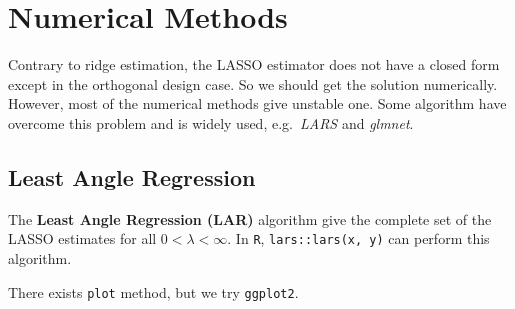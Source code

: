 \documentclass[]{book}
\newenvironment{Shaded}{\begin{snugshade}}{\end{snugshade}}
\newcommand{\CommentTok}[1]{\textcolor[rgb]{0.56,0.35,0.01}{\textit{#1}}}
\newcommand{\DataTypeTok}[1]{\textcolor[rgb]{0.13,0.29,0.53}{#1}}
\newcommand{\DecValTok}[1]{\textcolor[rgb]{0.00,0.00,0.81}{#1}}
\newcommand{\KeywordTok}[1]{\textcolor[rgb]{0.13,0.29,0.53}{\textbf{#1}}}
\newcommand{\NormalTok}[1]{#1}
\newcommand{\OperatorTok}[1]{\textcolor[rgb]{0.81,0.36,0.00}{\textbf{#1}}}
\newcommand{\OtherTok}[1]{\textcolor[rgb]{0.56,0.35,0.01}{#1}}
\newcommand{\StringTok}[1]{\textcolor[rgb]{0.31,0.60,0.02}{#1}}
\theoremstyle{definition}
\theoremstyle{definition}
\theoremstyle{definition}
\theoremstyle{remark}
\begin{document}
\hypertarget{numerical-methods}{%
\section{Numerical Methods}\label{numerical-methods}}

Contrary to ridge estimation, the LASSO estimator does not have a closed form except in the orthogonal design case. So we should get the solution numerically. However, most of the numerical methods give unstable one. Some algorithm have overcome this problem and is widely used, e.g.~\emph{LARS} and \emph{glmnet}.

\hypertarget{least-angle-regression}{%
\subsection{Least Angle Regression}\label{least-angle-regression}}

The \textbf{Least Angle Regression (LAR)} algorithm \citep{Hastie:2013aa} give the complete set of the LASSO estimates for all \(0 < \lambda < \infty\). In \texttt{R}, \texttt{lars::lars(x,\ y)} can perform this algorithm.

\begin{Shaded}
\end{Shaded}

There exists \texttt{plot} method, but we try \texttt{ggplot2}.
\end{document}
